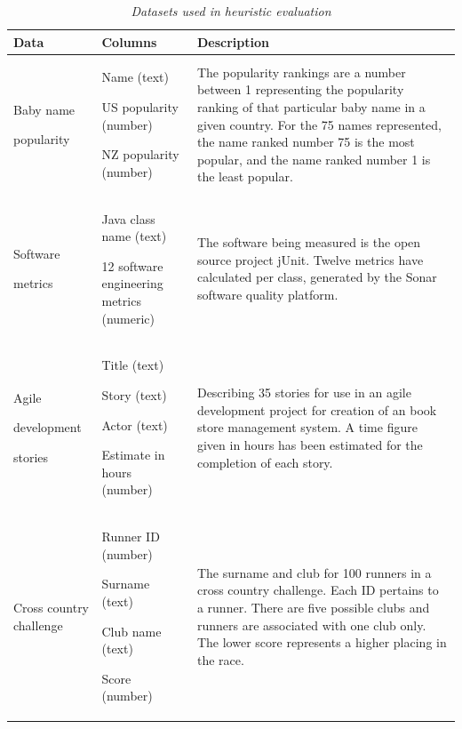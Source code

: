 \begin{table}
\centering
\caption{\textit{Datasets used in heuristic evaluation}}
\begin{tabular}{|p{2cm}|p{5cm}|p{6cm}|} \hline
\textbf{Data}&\textbf{Columns}&\textbf{Description}\\ \hline
Baby name\par popularity 
& 
Name (text)\par
US popularity (number)\par
NZ popularity (number)\par
&
The popularity rankings are a number between 1\textendash75 representing the popularity ranking of that particular baby name in a given country. For the 75 names represented, the name ranked number 75 is the most popular, and the name ranked number 1 is the least popular. \\ \hline
Software\par metrics
&
Java class name (text)\par
12 software engineering metrics (numeric)\par
&
The software being measured is the open source project jUnit. Twelve metrics have calculated per class, generated by the Sonar software quality platform.\\ \hline
Agile\par development\par stories&
Title (text)\par
Story (text)\par
Actor (text)\par
Estimate in hours (number)\par
&
Describing 35 stories for use in an agile development project for creation of an book store management system. A time figure given in hours has been estimated for the completion of each story.\\ \hline
Cross country challenge
&
Runner ID (number)\par
Surname (text)\par
Club name (text)\par
Score (number)\par
&
The surname and club for 100 runners in a cross country challenge. Each ID pertains to a runner. There are five possible clubs and runners are associated with one club only. The lower score represents a higher placing in the race. \\ \hline
\end{tabular}
\label{table:datasetheuristiceval}
\end{table}

